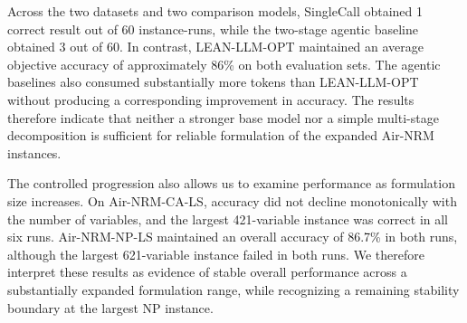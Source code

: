 \documentclass[11pt]{article}
\begin{document}
\begin{enumerate}[label=(AssoE.\arabic*),leftmargin=*]
\begin{enumerate}[label=(R2.Major.\arabic*),leftmargin=*]
\begin{table}[!htbp]
\centering
\caption{Accuracy and resource use on the large-scale Air-NRM instances.}
\label{tab:air-nrm-ls-results-response}
\end{table}

Across the two datasets and two comparison models, SingleCall obtained
1 correct result out of 60 instance-runs, while the two-stage agentic
baseline obtained 3 out of 60. In contrast, LEAN-LLM-OPT maintained an
average objective accuracy of approximately 86\% on both evaluation sets.
The agentic baselines also consumed substantially more tokens than
LEAN-LLM-OPT without producing a corresponding improvement in accuracy.
The results therefore indicate that neither a stronger base model nor a
simple multi-stage decomposition is sufficient for reliable formulation of
the expanded Air-NRM instances.

The controlled progression also allows us to examine performance as
formulation size increases. On Air-NRM-CA-LS, accuracy did not decline
monotonically with the number of variables, and the largest 421-variable
instance was correct in all six runs. Air-NRM-NP-LS maintained an overall
accuracy of 86.7\% in both runs, although the largest 621-variable instance
failed in both runs. We therefore interpret these results as evidence of
stable overall performance across a substantially expanded formulation
range, while recognizing a remaining stability boundary at the largest NP
instance.


\end{enumerate}
\end{enumerate}
\end{document}
